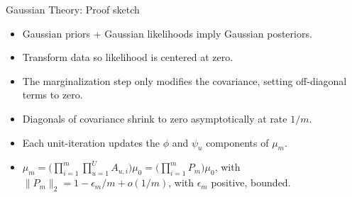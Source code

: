 \documentclass[aspectratio=169]{beamer}\usepackage[]{graphicx}\usepackage[]{xcolor}
\begin{document}
\begin{frame}{Gaussian Theory: Proof sketch}

\begin{itemize}
  \item Gaussian priors + Gaussian likelihoods imply Gaussian posteriors.
  \item Transform data so likelihood is centered at zero.
  \item The marginalization step only modifies the covariance, setting off-diagonal terms to zero.
  \item Diagonals of covariance shrink to zero asymptotically at rate $1/m$.
  \item Each unit-iteration updates the $\phi$ and $\psi_u$ components of $\mu_m$.
  \item $\mu_m = \big(\prod_{i = 1}^m\prod_{u = 1}^U A_{u, i}\big) \mu_0 = \big(\prod_{i = 1}^m P_m\big) \mu_0$, with $\|P_m\|_2 = 1 - \epsilon_m/m + o(1/m)$, with $\epsilon_m$ positive, bounded.
\end{itemize}

\end{frame}
\end{document}
